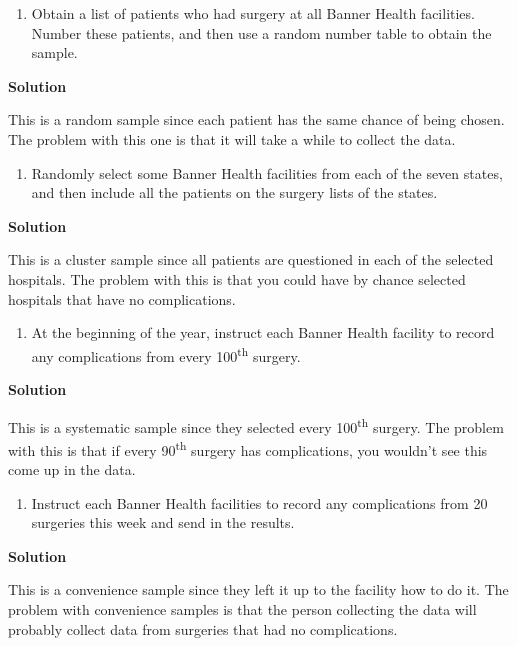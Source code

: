 \documentclass[
]{book}
\providecommand{\tightlist}{%
  \setlength{\itemsep}{0pt}\setlength{\parskip}{0pt}}
\begin{document}
\begin{enumerate}
\def\labelenumi{\alph{enumi}.}
\setcounter{enumi}{1}
\tightlist
\item
  Obtain a list of patients who had surgery at all Banner Health
  facilities. Number these patients, and then use a random number
  table to obtain the sample.
\end{enumerate}

\textbf{Solution}

This is a random sample since each patient has the same chance of being chosen. The problem with this one is that it will take a while to collect the data.

\begin{enumerate}
\def\labelenumi{\alph{enumi}.}
\setcounter{enumi}{2}
\tightlist
\item
  Randomly select some Banner Health facilities from each of the seven states, and then include all the patients on the surgery lists of the states.
\end{enumerate}

\textbf{Solution}

This is a cluster sample since all patients are questioned in each of the selected hospitals. The problem with this is that you could have by chance selected hospitals that have no complications.

\begin{enumerate}
\def\labelenumi{\alph{enumi}.}
\setcounter{enumi}{3}
\tightlist
\item
  At the beginning of the year, instruct each Banner Health facility to record any complications from every 100\textsuperscript{th} surgery.
\end{enumerate}

\textbf{Solution}

This is a systematic sample since they selected every 100\textsuperscript{th} surgery. The problem with this is that if every 90\textsuperscript{th} surgery has complications, you wouldn't see this come up in the data.

\begin{enumerate}
\def\labelenumi{\alph{enumi}.}
\setcounter{enumi}{4}
\tightlist
\item
  Instruct each Banner Health facilities to record any complications from 20 surgeries this week and send in the results.
\end{enumerate}

\textbf{Solution}

This is a convenience sample since they left it up to the facility how to do it. The problem with convenience samples is that the person collecting the data will probably collect data from surgeries that had no complications.
\end{document}
